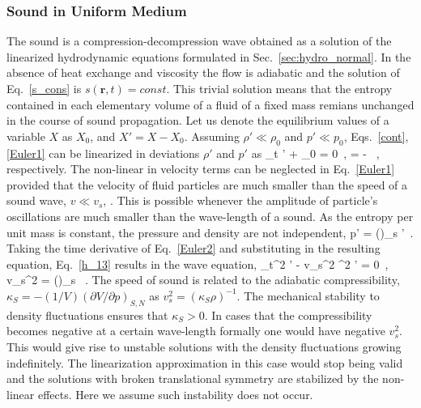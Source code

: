  
\subsubsection{Sound in Uniform Medium}
\label{sec:sound_uniform}
The sound is a compression-decompression wave obtained as a solution of the linearized hydrodynamic equations formulated in Sec.~\ref{sec:hydro_normal}.
In the absence of heat exchange and viscosity the flow is adiabatic and the  solution of Eq.~\eqref{s_cons} is $s(\bm{r},t) = const$.
This trivial solution means that the entropy contained in each elementary volume of a fluid of a fixed mass remians unchanged in the course of sound propagation.
Let us denote the equilibrium values of a variable $X$ as $X_0$, and $X' = X - X_0$.
Assuming $\rho' \ll \rho_0$ and $p' \ll p_0$,  Eqs.~\eqref{cont}, \eqref{Euler1} can be linearized in deviations $\rho'$ and $p'$ as 
\be\label{cont2}
\partial_t \rho' +  \rho_0 \bm{\nabla} \cdot {} = 0\, ,
\ee
\be\label{Euler2}
  = -  \, ,
\ee 
respectively.
The non-linear in velocity terms can be neglected in Eq.~\eqref{Euler1} provided that the velocity of fluid particles are much smaller than the speed of 
a sound wave,
$v \ll v_s$, \cite{LL}.
This is possible whenever the amplitude of particle's oscillations are much smaller than the wave-length of a sound.
As the entropy per unit mass is constant, the pressure and density are not independent,
\be\label{h_13}
{\bm{ \nabla} p'} = \left(\right)_s  {\bm{ \nabla} \rho'}\, .
\ee
Taking the time derivative of Eq.~\eqref{Euler2} and substituting in the resulting equation, Eq.~\eqref{h_13} results in the wave equation,
\be\label{s_13}
\partial_t^2 \rho' - v_s^{2} \bm{\nabla}^2  \rho'  = 0\, , \quad v_s^{2} =  \left(\right)_s \, .
\ee
The speed of sound is related to the adiabatic compressibility, $\kappa_S = -(1/ V)\left(\partial V/\partial p\right)_{S,N}$ as 
$v_s^2 = (\kappa_S \rho)^{-1}$.
The mechanical stability to density fluctuations ensures that $\kappa_S > 0$.
In cases that the compressibility becomes negative at a certain wave-length formally one would have negative $v_s^2$.
This would give rise to unstable solutions with the density fluctuations growing indefinitely.
The linearization approximation in this case would stop being valid and the solutions with broken translational symmetry are stabilized by the non-linear effects. Here we assume such instability does not occur.
